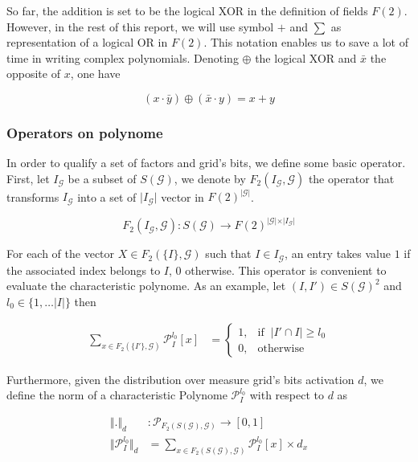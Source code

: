 \documentclass[a4paper, 11pt]{article}
\begin{document}
So far, the addition is set to be the logical XOR in the definition of fields $F(2)$. However, in the rest of this report, we will use symbol $+$ and $\sum$ as representation of a logical OR in $F(2)$. This notation enables us to save a lot of time in writing complex polynomials. Denoting $\oplus$ the logical XOR and $\bar{x}$ the opposite of $x$, one have

\begin{equation*}
(x \cdot \bar{y}) \oplus (\bar{x} \cdot y) = x + y 
\end{equation*}  

\subsubsection*{Operators on polynome}

In order to qualify a set of factors and grid's bits, we define some basic operator. First, let  $I_{\mathcal{G}}$ be a subset of $S(\mathcal{G})$, we denote by $F_2(I_{\mathcal{G}}, \mathcal{G})$ the operator that transforms $I_{\mathcal{G}}$ into a set of $\vert I_{\mathcal{G}} \vert$ vector in $F(2)^{\vert \mathcal{G} \vert}$. 

\begin{equation*}
F_2(I_{\mathcal{G}}, \mathcal{G})  : S(\mathcal{G}) \rightarrow  F(2)^{\vert \mathcal{G} \vert \times \vert I_{\mathcal{G}} \vert} 
\end{equation*}

For each of the vector $X \in F_2(\{I\}, \mathcal{G})$ such that $I\in I_{\mathcal{G}}$, an entry takes value $1$ if the associated index belongs to $I$, 0 otherwise. This operator is convenient to evaluate the characteristic polynome. As an example, let $(I, I') \in S(\mathcal{G})^{2}$ and $l_0 \in \{ 1, \ldots \vert I \vert \}$ then 

\begin{align*}
\sum_{x \in F_2(\lbrace I' \rbrace, \mathcal{G})} \mathcal{P}_I^{l_0} \left[ x \right]  &= \begin{cases} 1, & \text{if }\ \vert I'\cap I \vert \geq l_0 \\ 0, & \text{otherwise} \end{cases}
\end{align*}

Furthermore, given the distribution over measure grid's bits activation $d$, we define the norm of a characteristic Polynome $\mathcal{P}_I^{l_0}$ with respect to $d$ as

\begin{align*}
\Vert . \Vert_{d} &: \mathcal{P}_{F_2(S(\mathcal{G}), \mathcal{G})} \rightarrow \left[ 0, 1\right] \\
\Vert \mathcal{P}_I^{l_0} \Vert_{d} &= \sum_{x \in F_2(S(\mathcal{G}), \mathcal{G})} \mathcal{P}_I^{l_0}\left[ x \right] \times d_x
\end{align*}
\end{document}
